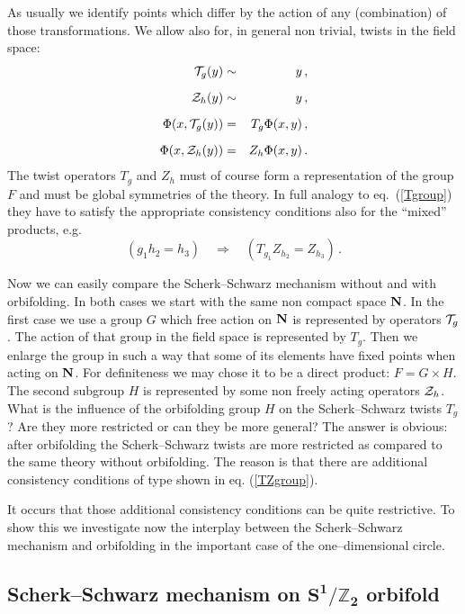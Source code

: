 \documentclass[a4paper,12pt]{article}
\def\cT{{\cal T}}
\def\cZ{{\cal Z}}
\def\bN{{\bf N}}
\def\ZZ{\mathbb Z}
\begin{document}
As usually we identify points which differ by the action of any
(combination) of those transformations. We allow also for, in general
non trivial, twists in the field space: 
\begin{eqnarray}
\cT_g(y) &\sim& y
\,,
\label{TZ1}
\\[6pt]
\cZ_h(y) &\sim& y
\,,
\\[6pt]
\Phi(x,\cT_g(y)) &=& T_g\Phi(x,y)
\,,
\\[6pt]
\Phi(x,\cZ_h(y)) &=& Z_h\Phi(x,y)
\,.
\label{TZ4}
\end{eqnarray}
The twist operators $T_g$ and $Z_h$ must of course form a
representation of the group $F$ and must be global symmetries of the
theory. In full analogy to eq.\ 
(\ref{Tgroup}) they have to satisfy the appropriate consistency
conditions also for the ``mixed'' products, e.g.
\begin{equation}
(g_1h_2=h_3)
\quad\Rightarrow\quad
(T_{g_1}Z_{h_2}=Z_{h_3})
\,.
\label{TZgroup}
\end{equation}


Now we can easily compare the Scherk--Schwarz mechanism without and
with orbifolding. In both cases we start with the same non compact
space $\bN$. In the first case we use a group $G$ which free action on
$\bN$ is represented by operators $\cT_g$. The action of that group in
the field space is represented by $T_g$. Then we enlarge the group in
such a way that some of its elements have fixed points when acting on
$\bN$. For definiteness we may chose it to be a direct product: 
$F=G\times H$. The second subgroup $H$ is represented
by some non freely acting operators $\cZ_h$. What is the influence of
the orbifolding group $H$ on the Scherk--Schwarz twists $T_g$? Are
they more restricted or can they be more general? The answer is
obvious: after orbifolding the Scherk--Schwarz twists are more
restricted as compared to the same theory without orbifolding. The
reason is that there are additional consistency conditions of type
shown in eq. (\ref{TZgroup}). 


It occurs that those additional consistency conditions can be quite
restrictive. To show this we investigate now the interplay between
the Scherk--Schwarz mechanism and orbifolding in the important case of
the one--dimensional circle.




\subsection{Scherk--Schwarz mechanism on $\boldsymbol{S^1/\ZZ_2}$
orbifold} 
\end{document}
